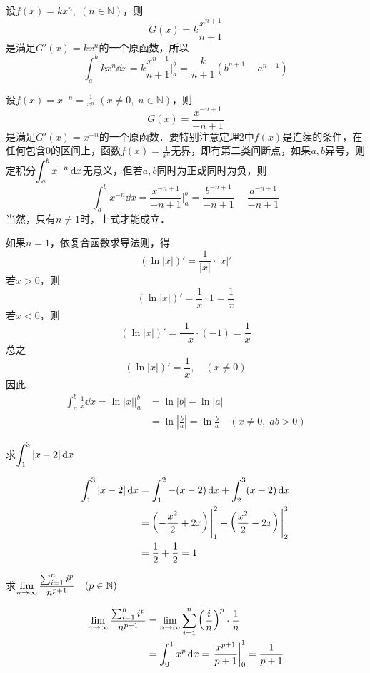 \begin{example}
    设$f(x)=kx^n,\; (n\in\mathbb{N})$，则
\[G(x)=k\frac{x^{n+1}}{n+1}\]
是满足$G'(x)=kx^n$的一个原函数，所以
\[\int^b_akx^n\dd x=k\frac{x^{n+1}}{n+1}\Bigg|^b_a=\frac{k}{n+1}(b^{n+1}-a^{n+1})\]
\end{example}

\begin{example}
设$f(x)=x^{-n}=\frac{1}{x^n}\; (x\ne 0,\; n\in\mathbb{N})$，则
\[G(x)=\frac{x^{-n+1}}{-n+1}\]
是满足$G'(x)=x^{-n}$的一个原函数．要特别注意定理2中$f(x)$是连续的条件，在任何包含0的区间上，函数$f(x)=\frac{1}{x^n}$无界，即有第二类间断点，如果$a,b$异号，则定积分$\displaystyle\int^b_a x^{-n}\,{\rm d} x$无意义，但若$a,b$同时为正或同时为负，则
\[\int^b_ax^{-n}\dd x=\frac{x^{-n+1}}{-n+1}\Bigg|^b_a=\frac{b^{-n+1}}{-n+1}-\frac{a^{-n+1}}{-n+1}\]
当然，只有$n\ne 1$时，上式才能成立．

如果$n=1$，依复合函数求导法则，得
\[(\ln|x|)'=\frac{1}{|x|}\cdot |x|'\]
若$x>0$，则
\[(\ln|x|)'=\frac{1}{x}\cdot 1=\frac{1}{x}\]
若$x<0$，则
\[(\ln|x|)'=\frac{1}{-x}\cdot (-1)=\frac{1}{x}\]
总之
\[(\ln|x|)'=\frac{1}{x},\quad (x\ne 0)\]
因此
\[\begin{split}
\int^b_a \frac{1}{x}\dd x=\ln |x|\Bigg|^b_a &=\ln|b|-\ln |a|\\
&=\ln\left|\frac{b}{a}\right|=\ln\frac{b}{a}\quad (x\ne 0,\; ab>0)
\end{split}\]
\end{example}

\begin{example}
    求$\displaystyle\int^3_1 |x-2|\,{\rm d} x$
\end{example}

\begin{solution}
\[\begin{split}
    \displaystyle\int^3_1 |x-2|\,{\rm d} x&=\displaystyle\int^2_1 -(x-2)\,{\rm d} x+\displaystyle\int^3_2 (x-2)\,{\rm d} x\\
&=\left(-\dfrac{x^2}{2}+2x\right)\Bigg|^2_1+\left(\dfrac{x^2}{2}-2x\right)\Bigg|^3_2\\
&=\dfrac{1}{2}+\dfrac{1}{2}=1
\end{split}\]
\end{solution}

\begin{example}
求$\displaystyle\lim_{n\to\infty}\dfrac{\sum^n_{i=1}i^p}{n^{p+1}}\quad (p\in \mathbb{N})$
\end{example}


\begin{solution}
\[\begin{split}
    \displaystyle\lim_{n\to\infty}\dfrac{\sum^n_{i=1}i^p}{n^{p+1}}&=\displaystyle\lim_{n\to\infty}\sum^n_{i=1}\left(\dfrac{i}{n}\right)^p\cdot \dfrac{1}{n}\\
    &=\int^1_0 x^p\,{\rm d} x=\left.\dfrac{x^{p+1}}{p+1}\right|^1_0=\dfrac{1}{p+1}
\end{split}\]
\end{solution}

